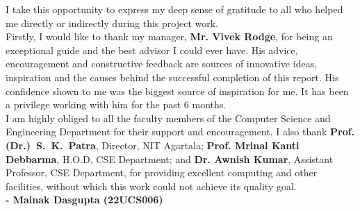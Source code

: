 \documentclass[USenglish,a4paper,12pt]{nitathesis}
\numberwithin{figure}{chapter}
\begin{document}

\beforepreface
{}
I take this opportunity to express my deep sense of gratitude to all who helped me directly or indirectly during this project work. \\
Firstly, I would like to thank my manager, \textbf{Mr. Vivek Rodge}, for being an exceptional guide and the best advisor I could ever have. His advice, encouragement and constructive feedback are sources of innovative ideas, inspiration and the causes behind the successful completion of this report. His confidence shown to me was the biggest source of inspiration for me. It has been a privilege working with him for the past 6 months.\\ 
I am highly obliged to all the faculty members of the Computer Science and Engineering Department for their support and encouragement. I also thank  \textbf{Prof.(Dr.)~S.~K.~Patra}, Director, NIT Agartala; \textbf{Prof. Mrinal Kanti Debbarma}, H.O.D, CSE Department; and \textbf{Dr. Awnish Kumar}, Assistant Professor, CSE Department, for providing excellent computing and other facilities, without which this work could not achieve its quality goal.\\



\vspace*{0.5cm} 
\hspace*{0.5cm}\textbf{\large - Mainak Dasgupta (22UCS006)}

 
\end{document}
